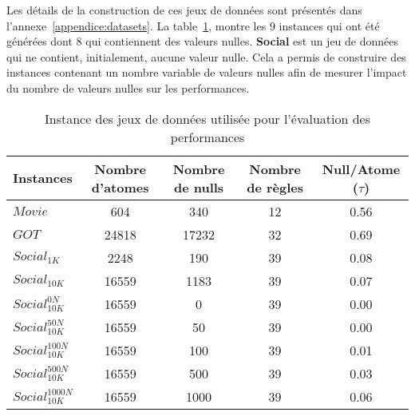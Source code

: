 Les détails de la construction de ces jeux de données sont présentés dans l'annexe~\ref{appendice:datasets}.
La table~\ref{table:update:xp:datasets}, montre les 9 instances qui ont été générées dont 8 qui contiennent des valeurs nulles.
\textbf{Social} est un jeu de données qui ne contient, initialement, aucune valeur nulle.
Cela a permis de construire des instances contenant un nombre variable de valeurs nulles afin de mesurer l'impact du nombre de valeurs nulles sur les performances.

\begin{table}[htb]
    \centering
    \begin{tabular}{l|c|c|c|c}
        Instances              & Nombre d'atomes & Nombre de nulls & Nombre de règles & Null/Atome ($\tau$) \\
        \hline
        \hline
        $Movie$                & \num{604}       & \num{340}       & \num{12}         & \num{0.56}          \\
        $GOT$                  & \num{24818}     & \num{17232}     & \num{32}         & \num{0.69}          \\
        \hline
        $Social_{1K}$          & \num{2248}      & \num{190}       & \num{39}         & \num{0.08}          \\
        $Social_{10K}$         & \num{16559}     & \num{1183}      & \num{39}         & \num{0.07}          \\
        \hline
        $Social_{10K}^{0N}$    & \num{16559}     & \num{0}         & \num{39}         & \num{0.00}          \\
        $Social_{10K}^{50N}$   & \num{16559}     & \num{50}        & \num{39}         & \num{0.00}          \\
        $Social_{10K}^{100N}$  & \num{16559}     & \num{100}       & \num{39}         & \num{0.01}          \\
        $Social_{10K}^{500N}$  & \num{16559}     & \num{500}       & \num{39}         & \num{0.03}          \\
        $Social_{10K}^{1000N}$ & \num{16559}     & \num{1000}      & \num{39}         & \num{0.06}          \\
    \end{tabular}
    \caption{Instance des jeux de données utilisée pour l'évaluation des performances}
    \label{table:update:xp:datasets}
\end{table}

